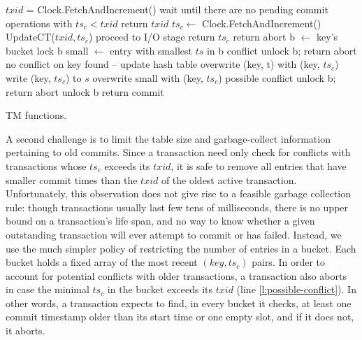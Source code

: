 \begin{algorithm}[htb]
\begin{algorithmic}[1]
\begin{small}
\State $txid$ = Clock.FetchAndIncrement()
\State wait until there are no pending commit operations 
\State \hspace{18pt} with $ts_c < txid$
\State return $txid$
\EndProcedure
\Statex
{}
\State $ts_c \leftarrow$ Clock.FetchAndIncrement()
 \State UpdateCT($txid, ts_c$) \Comment proceed to I/O stage
 \State return $ts_c$
 \Else
 \State return {\sc abort}
\EndIf
\EndProcedure
\Statex
{}
  \State b $\leftarrow$ key's bucket
  \State lock b  \label{l:lock}
  \State small $\leftarrow$ entry with smallest $ts$ in b
   \Comment conflict  \label{l:conflict}
    \State unlock b; return {\sc abort}
  \EndIf
  \Statex 
  \Comment no conflict on key found -- update hash table 
    \label{l:update-start}
    \State overwrite (key, t) with (key, $ts_c$)
    \State write (key, $ts_c$) to $s$
	      \State overwrite small with (key, $ts_c$)  \label{l:update-end}
     \Else  \Comment possible conflict  \label{l:possible-conflict}
   \State unlock b; return {\sc abort}
  \EndIf  
\State unlock b
\EndFor
\State return {\sc commit}
\EndProcedure
\end{small}
\end{algorithmic}
\caption{TM functions.} 
\label{fig:commit-pseudocode}
\end{algorithm} 

A second challenge is to limit the table size and garbage-collect information pertaining to old commits. Since a transaction need only check for conflicts with transactions whose $ts_c$ exceeds its $txid$, it is safe to remove all entries that have smaller commit times  than the $txid$ of the oldest active transaction. Unfortunately, this observation does not give rise to a feasible garbage collection rule:
though transactions usually last few tens of milliseconds, there is no upper bound on  a transaction's life span, and no way to know whether a given outstanding transaction will ever attempt to commit or has failed. 
Instead, we use the much simpler policy of restricting the number of entries in a bucket. Each bucket holds a fixed array of the most recent $(key, ts_c)$ pairs. In order to account for potential conflicts with older transactions, a transaction also aborts in case the minimal $ts_c$ in the bucket exceeds its $txid$ (line \ref{l:possible-conflict}). 
In other words, a transaction expects to find, in every bucket it checks, at least one commit timestamp older than its start time or one empty slot, 
and if it does not, it aborts.

